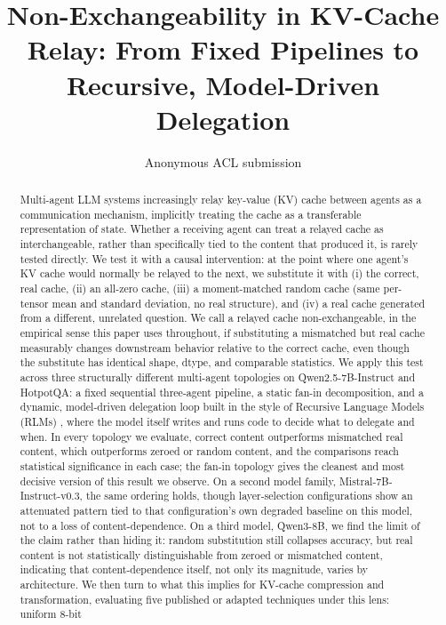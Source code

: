 \documentclass[11pt]{article}
\title{Non-Exchangeability in KV-Cache Relay: From Fixed Pipelines to Recursive, Model-Driven Delegation}
\author{Anonymous ACL submission}
\begin{document}
\maketitle

\begin{abstract}
Multi-agent LLM systems increasingly relay key-value (KV) cache between
agents as a communication mechanism, implicitly treating the cache as a
transferable representation of state. Whether a receiving agent can treat
a relayed cache as interchangeable, rather than specifically tied to the
content that produced it, is rarely tested directly. We test it with a
causal intervention: at the point where one agent's KV cache would
normally be relayed to the next, we substitute it with (i) the correct,
real cache, (ii) an all-zero cache, (iii) a moment-matched random cache
(same per-tensor mean and standard deviation, no real structure), and
(iv) a real cache generated from a different, unrelated question. We
call a relayed cache non-exchangeable, in the empirical sense this paper
uses throughout, if substituting a mismatched but real cache measurably
changes downstream behavior relative to the correct cache, even though
the substitute has identical shape, dtype, and comparable statistics. We
apply this test across three structurally different multi-agent
topologies on Qwen2.5-7B-Instruct and HotpotQA: a fixed sequential
three-agent pipeline, a static fan-in decomposition, and a dynamic,
model-driven delegation loop built in the style of Recursive Language
Models (RLMs) \citep{rlm2026}, where the model itself writes and runs
code to decide what to delegate and when. In every topology we evaluate,
correct content outperforms mismatched real content, which outperforms
zeroed or random content, and the comparisons reach statistical
significance in each case; the fan-in topology gives the cleanest and
most decisive version of this result we observe. On a second model
family, Mistral-7B-Instruct-v0.3, the same ordering holds, though
layer-selection configurations show an attenuated pattern tied to that
configuration's own degraded baseline on this model, not to a loss of
content-dependence. On a third model, Qwen3-8B, we find the limit of the
claim rather than hiding it: random substitution still collapses
accuracy, but real content is not statistically distinguishable from
zeroed or mismatched content, indicating that content-dependence itself,
not only its magnitude, varies by architecture. We then turn to what
this implies for KV-cache compression and transformation, evaluating
five published or adapted techniques under this lens: uniform 8-bit

\end{abstract}
\end{document}
